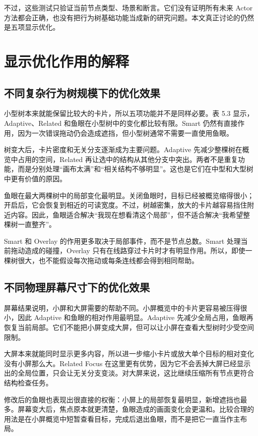 \documentclass[11pt,a4paper,oneside,extrafontsizes]{memoir}
\begin{document}
不过，这些测试只验证当前节点类型、场景和断言。它们没有证明所有未来 Actor 方法都会正确，也没有把行为树基础功能当成新的研究问题。本文真正讨论的仍然是五项显示优化。

\section{显示优化作用的解释}

\subsection{不同复杂行为树规模下的优化效果}

小型树本来就能保留比较大的卡片，所以五项功能并不是同样必要。表 5.3 显示，Adaptive、Related 和鱼眼在小型树中的变化都比较有限。Smart 仍然有直接作用，因为一次错误拖动仍会造成遮挡，但小型树通常不需要一直使用鱼眼。

树变大后，卡片密度和无关分支逐渐成为主要问题。Adaptive 先减少整棵树在概览中占用的空间，Related 再让选中的结构从其他分支中突出。两者不是重复功能，而是分别处理“画布太满”和“相关结构不够明显”。这也是它们在中型和大型树中更有价值的原因。

鱼眼在最大两棵树中的局部变化最明显。关闭鱼眼时，目标已经被概览缩得很小；开启后，它会恢复到相近的可读宽度。不过，树越密集，放大的卡片越容易挡住附近内容。因此，鱼眼适合解决“我现在想看清这个局部”，但不适合解决“我希望整棵树一直整齐”。

Smart 和 Overlay 的作用更多取决于局部事件，而不是节点总数。Smart 处理当前拖动造成的碰撞，Overlay 只有在线路穿过卡片时才有明显作用。所以，即使一棵树很大，也不能假设每次拖动或每条连线都会得到相同帮助。

\subsection{不同物理屏幕尺寸下的优化效果}

屏幕结果说明，小屏和大屏需要的帮助不同。小屏概览中的卡片更容易被压得很小，因此 Adaptive 和鱼眼的相对作用最明显。Adaptive 先减少全局占用，鱼眼再恢复当前局部。它们不能把小屏变成大屏，但可以让小屏在查看大型树时少受空间限制。

大屏本来就能同时显示更多内容，所以进一步缩小卡片或放大单个目标的相对变化没有小屏那么大。Related Focus 在这里更有优势，因为它不会丢掉大屏已经显示出的全局位置，只会让无关分支变淡。对大屏来说，这比继续压缩所有节点更符合结构检查任务。

修改后的鱼眼也表现出很直接的权衡：小屏上的局部恢复最明显，新增遮挡也最多。屏幕变大后，焦点原本就更清楚，鱼眼造成的画面变化会更温和。比较合理的用法是在小屏概览中短暂查看目标，完成后退出鱼眼，而不是把它一直当作主布局。
\end{document}
